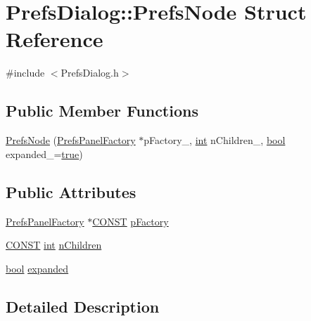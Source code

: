 \hypertarget{struct_prefs_dialog_1_1_prefs_node}{}\section{Prefs\+Dialog\+:\+:Prefs\+Node Struct Reference}
\label{struct_prefs_dialog_1_1_prefs_node}


{\ttfamily \#include $<$Prefs\+Dialog.\+h$>$}

\subsection*{Public Member Functions}
\begin{DoxyCompactItemize}
\item 
\hyperlink{struct_prefs_dialog_1_1_prefs_node_a1e2d9b97a8f91bb068703f759affa91f}{Prefs\+Node} (\hyperlink{class_prefs_panel_factory}{Prefs\+Panel\+Factory} $\ast$p\+Factory\+\_\+, \hyperlink{xmltok_8h_a5a0d4a5641ce434f1d23533f2b2e6653}{int} n\+Children\+\_, \hyperlink{mac_2config_2i386_2lib-src_2libsoxr_2soxr-config_8h_abb452686968e48b67397da5f97445f5b}{bool} expanded\+\_\+=\hyperlink{mac_2config_2i386_2lib-src_2libsoxr_2soxr-config_8h_a41f9c5fb8b08eb5dc3edce4dcb37fee7}{true})
\end{DoxyCompactItemize}
\subsection*{Public Attributes}
\begin{DoxyCompactItemize}
\item 
\hyperlink{class_prefs_panel_factory}{Prefs\+Panel\+Factory} $\ast$\hyperlink{_view_info_8h_a0c33b494a68ce28497e7ce8e5e95feff}{C\+O\+N\+ST} \hyperlink{struct_prefs_dialog_1_1_prefs_node_ac8777f7c94379a77fe7d05a655f5594e}{p\+Factory}
\item 
\hyperlink{_view_info_8h_a0c33b494a68ce28497e7ce8e5e95feff}{C\+O\+N\+ST} \hyperlink{xmltok_8h_a5a0d4a5641ce434f1d23533f2b2e6653}{int} \hyperlink{struct_prefs_dialog_1_1_prefs_node_ad71edd162a476dc376c40b79bdf8f7c6}{n\+Children}
\item 
\hyperlink{mac_2config_2i386_2lib-src_2libsoxr_2soxr-config_8h_abb452686968e48b67397da5f97445f5b}{bool} \hyperlink{struct_prefs_dialog_1_1_prefs_node_ae73e011aaf2164408148dee48b40830f}{expanded}
\end{DoxyCompactItemize}


\subsection{Detailed Description}


